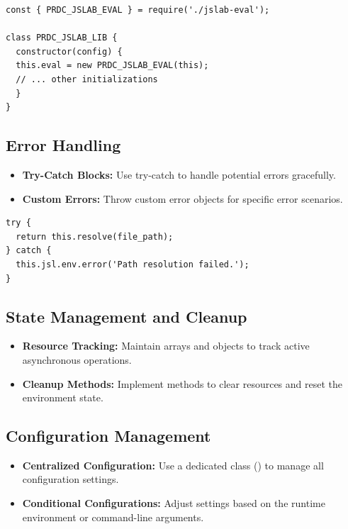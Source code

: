 \documentclass[12pt,a4paper]{article}
\begin{document}
\begin{lstlisting}[style=JavaScriptStyle]
const { PRDC_JSLAB_EVAL } = require('./jslab-eval');

class PRDC_JSLAB_LIB {
  constructor(config) {
  this.eval = new PRDC_JSLAB_EVAL(this);
  // ... other initializations
  }
}
\end{lstlisting}

\subsection{Error Handling}
\begin{itemize}
  \item \textbf{Try-Catch Blocks:} Use try-catch to handle potential errors gracefully.
  
  \item \textbf{Custom Errors:} Throw custom error objects for specific error scenarios.
\end{itemize}

\begin{lstlisting}[style=JavaScriptStyle]
try {
  return this.resolve(file_path);
} catch {
  this.jsl.env.error('Path resolution failed.');
}
\end{lstlisting}

\subsection{State Management and Cleanup}
\begin{itemize}
  \item \textbf{Resource Tracking:} Maintain arrays and objects to track active asynchronous operations.
  
  \item \textbf{Cleanup Methods:} Implement methods to clear resources and reset the environment state.
\end{itemize}

\subsection{Configuration Management}
\begin{itemize}
  \item \textbf{Centralized Configuration:} Use a dedicated class () to manage all configuration settings.
  
  \item \textbf{Conditional Configurations:} Adjust settings based on the runtime environment or command-line arguments.
\end{itemize}
\end{document}
